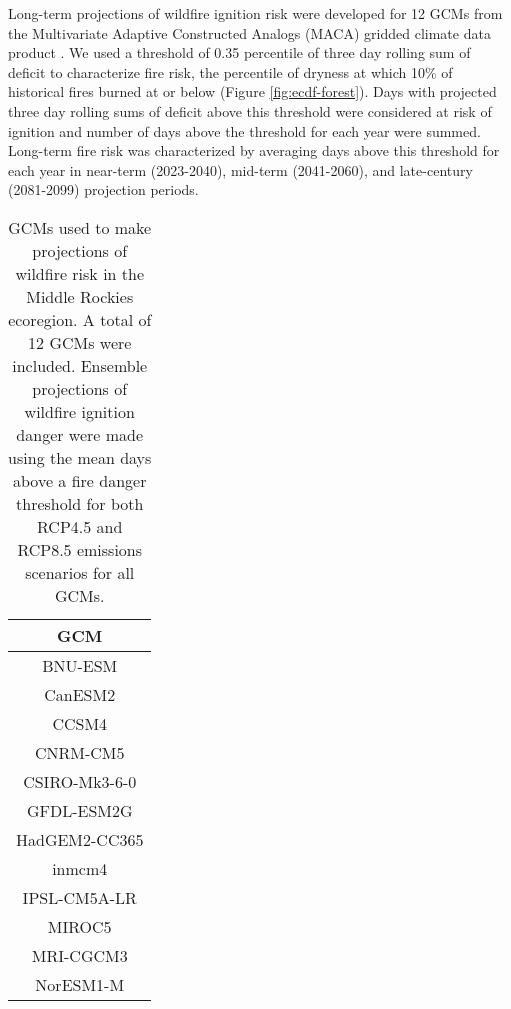 \documentclass[11p]{article}
\begin{document}
Long-term projections of wildfire ignition risk were developed for 12 GCMs from the Multivariate Adaptive Constructed Analogs (MACA) gridded climate data product \citep{abatzoglouComparisonStatisticalDownscaling2012}. We used a threshold of 0.35 percentile of three day rolling sum of deficit to characterize fire risk, the percentile of dryness at which 10\% of historical fires burned at or below (Figure \ref{fig:ecdf-forest}). Days with projected three day rolling sums of deficit above this threshold were considered at risk of ignition and number of days above the threshold for each year were summed. Long-term fire risk was characterized by averaging days above this threshold for each year in near-term (2023-2040), mid-term (2041-2060), and late-century (2081-2099) projection periods. 

\begin{table}[htbp]
  \centering
  \begin{tabular}{ c }
    \hline
    GCM \\
    \hline
    BNU-ESM \\
    CanESM2 \\
    CCSM4 \\
    CNRM-CM5 \\
    CSIRO-Mk3-6-0 \\
    GFDL-ESM2G \\
    HadGEM2-CC365 \\
    inmcm4 \\
    IPSL-CM5A-LR \\
    MIROC5 \\
    MRI-CGCM3 \\
    NorESM1-M \\
    \hline
  \end{tabular}
  \caption{GCMs used to make projections of wildfire risk in the Middle Rockies ecoregion. A total of 12 GCMs were included. Ensemble projections of wildfire ignition danger were made using the mean days above a fire danger threshold for both RCP4.5 and RCP8.5 emissions scenarios for all GCMs.}
  \label{table:gcms}
\end{table}


\end{document}
